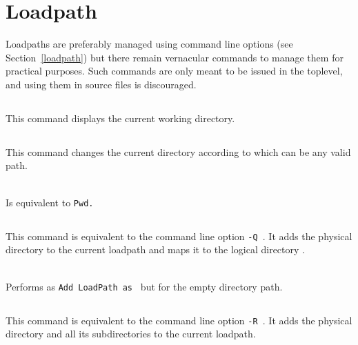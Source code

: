 \section[Loadpath]{Loadpath}

Loadpaths are preferably managed using {\Coq} command line options
(see Section~\ref{loadpath}) but there remain vernacular commands to
manage them for practical purposes. Such commands are only meant to be issued in
the toplevel, and using them in source files is discouraged.

\subsection[\tt Pwd.]{}
This command displays the current working directory.

\subsection[\tt Cd {\str}.]{}
This command changes the current directory according to {\str} 
which can be any valid path.

\begin{Variants}
\item {}\\
  Is equivalent to {\tt Pwd.}
\end{Variants}

\subsection[\tt Add LoadPath {\str} as {\dirpath}.]{}

This command is equivalent to the command line option {\tt -Q {\dirpath}
  {\str}}. It adds the physical directory {\str} to the current {\Coq}
loadpath and maps it to the logical directory {\dirpath}.

\begin{Variants}
\item {}\\
Performs as {\tt Add LoadPath {\str} as {\dirpath}} but for the empty directory path.
\end{Variants}

\subsection[\tt Add Rec LoadPath {\str} as {\dirpath}.]{}
This command is equivalent to the command line option {\tt -R {\dirpath}
  {\str}}. It adds the physical directory {\str} and all its
subdirectories to the current {\Coq} loadpath.

